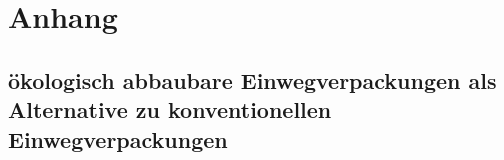 









{\chapter{Anhang}}
\label{chap:Anhang}


\section{ökologisch abbaubare Einwegverpackungen als Alternative zu konventionellen Einwegverpackungen}
\label{sec:Anhang:ökologisch abbaubare Einwegverpackungen als Alternative zu konventionellen Einwegverpackungen}
		
		




